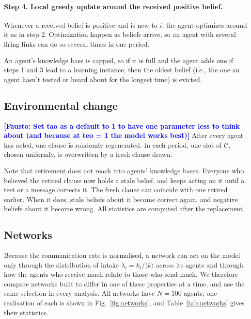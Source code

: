 \documentclass[11pt]{article}
\newcommand{\fausto}[1]{\textcolor{blue}{\textbf{[Fausto: #1]}}}
\begin{document}
\paragraph{Step 4. Local greedy update around the received positive belief.} Whenever a received belief is positive and is new to $i$, the agent optimizes around it as in step 2. Optimization happen as beliefs arrive, so an agent with several firing links can do so several times in one period.

An agent's knowledge base is capped, so if it is full and the agent adds one if steps 1 and 3 lead to a learning instance, then the oldest belief (i.e., the one an agent hasn't tested or heard about for the longest time) is evicted.


\subsection{Environmental change}
\fausto{Set tao as a default to 1 to have one parameter less to think about (and because at teo = 1 the model works best)}
After every agent has acted, one clause is randomly regenerated. In each period, one slot of $\mathcal{C}$, chosen uniformly, is overwritten by a fresh clause drawn. %

Note that retirement does not reach into agents' knowledge bases. Everyone who believed the retired clause now holds a stale belief, and keeps acting on it until a test or a message corrects it. The fresh clause can coincide with one retired earlier. When it does, stale beliefs about it become correct again, and negative beliefs about it become wrong. All statistics are computed after the replacement.

\subsection{Networks}\label{sec:networks}

Because the communication rate is normalised, a network can act on the model only through the distribution of intake $\lambda_i = k_i/\langle k\rangle$ across its agents and through how the agents who receive much relate to those who send much. We therefore compare networks built to differ in one of these properties at a time, and use the same selection in every analysis. All networks have $N = 100$ agents; one realisation of each is shown in Fig.~\ref{fig:networks}, and Table~\ref{tab:networks} gives their statistics.
\end{document}
